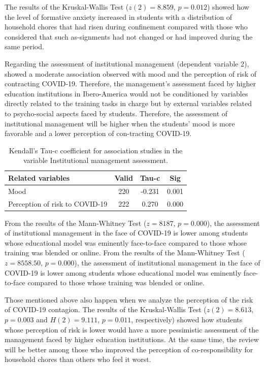\documentclass[english]{textolivre}
\begin{document}
The results of the Kruskal-Wallis Test ($z(2)=8.859$, $p=0.012$) showed how the level of formative anxiety increased in students with a distribution of household chores that had risen during confinement compared with those who considered that such as-signments had not changed or had improved during the same period.

Regarding the assessment of institutional management (dependent variable 2),  showed a moderate association observed with mood and the perception of risk of contracting COVID-19. Therefore, the management's assessment faced by higher education institutions in Ibero-America would not be conditioned by variables directly related to the training tasks in charge but by external variables related to psycho-social aspects faced by students. Therefore, the assessment of institutional management will be higher when the students' mood is more favorable and a lower perception of con-tracting COVID-19.

\begin{table}[h!]
\centering
\begin{threeparttable}
\caption{Kendall's Tau-c coefficient for association studies in the variable Institutional management assessment.}
\label{Table07}
\begin{tabular}{lccc}
\toprule
Related variables & Valid & Tau-c & Sig \\
\midrule
Mood & 220 & -0.231 & 0.001 \\
Perception of risk to COVID-19 & 222 & 0.270 & 0.000 \\
\bottomrule
\end{tabular}
\end{threeparttable}
\end{table}

From the results of the Mann-Whitney Test ($z=8187$, $p=0.000$), the assessment of institutional management in the face of COVID-19 is lower among students whose educational model was eminently face-to-face compared to those whose training was blended or online. From the results of the Mann-Whitney Test ($z=8558.50$, $p=0.000$), the assessment of institutional management in the face of COVID-19 is lower among students whose educational model was eminently face-to-face compared to those whose training was blended or online.

Those mentioned above also happen when we analyze the perception of the risk of COVID-19 contagion. The results of the Kruskal-Wallis Test ($z(2)=8.613$, $p=0.003$ and $H(2)=9.111$, $p=0.011$, respectively) showed how students whose perception of risk is lower would have a more pessimistic assessment of the management faced by higher education institutions. At the same time, the review will be better among those who improved the perception of co-responsibility for household chores than others who feel it worst.
\end{document}
